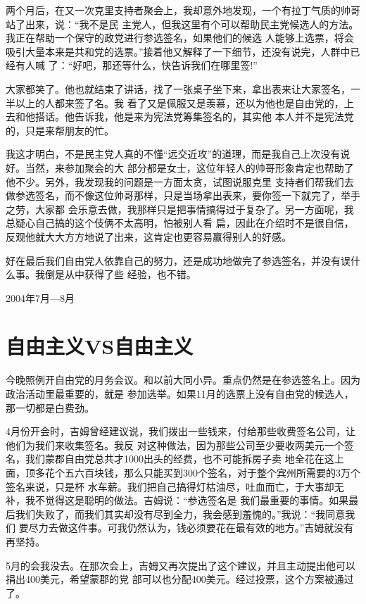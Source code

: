 ﻿\documentclass[11pt]{article}
\begin{document}
两个月后，在又一次克里支持者聚会上，我却意外地发现，一个有拉丁气质的帅哥站了出来，说：``我不是民
主党人，但我这里有个可以帮助民主党候选人的方法。我正在帮助一个保守的政党进行参选签名，如果他们的候选
人能够上选票，将会吸引大量本来是共和党的选票。''接着他又解释了一下细节，还没有说完，人群中已经有人喊
了：``好吧，那还等什么，快告诉我们在哪里签!''

大家都笑了。他也就结束了讲话，找了一张桌子坐下来，拿出表来让大家签名，一半以上的人都来签了名。我
看了又是佩服又是羡慕，还以为他也是自由党的，上去和他搭话。他告诉我，他是来为宪法党筹集签名的，其实他
本人并不是宪法党的，只是来帮朋友的忙。

我这才明白，不是民主党人真的不懂``远交近攻''的道理，而是我自己上次没有说好。当然，来参加聚会的大
部分都是女士，这位年轻人的帅哥形象肯定也帮助了他不少。另外，我发现我的问题是一方面太贪，试图说服克里
支持者们帮我们去做参选签名，而不像这位帅哥那样，只是当场拿出表来，要你签一下就完了，举手之劳，大家都
会乐意去做，我那样只是把事情搞得过于复杂了。另一方面呢，我总疑心自己搞的这个伎俩不太高明，怕被别人看
扁，因此在介绍时不是很自信，反观他就大大方方地说了出来，这肯定也更容易赢得别人的好感。

好在最后我们自由党人依靠自己的努力，还是成功地做完了参选签名，并没有误什么事。我倒是从中获得了些
经验，也不错。

2004年7月---8月

\section{自由主义VS自由主义}

今晚照例开自由党的月务会议。和以前大同小异。重点仍然是在参选签名上。因为政治活动里最重要的，就是
参加选举。如果11月的选票上没有自由党的候选人，那一切都是白费劲。

4月份开会时，吉姆曾经建议说，我们拨出一些钱来，付给那些收费签名公司，让他们为我们来收集签名。我反
对这种做法，因为那些公司至少要收两美元一个签名，我们蒙郡自由党总共才1000出头的经费，也不可能拆房子卖
地全花在这上面，顶多花个五六百块钱，那么只能买到300个签名，对于整个宾州所需要的3万个签名来说，只是杯
水车薪。我们把自己搞得灯枯油尽，吐血而亡，于大事却无补，我不觉得这是聪明的做法。吉姆说：``参选签名是
我们最重要的事情。如果最后我们失败了，而我们其实却没有尽到全力，我会感到羞愧的。''我说：``我同意我们
要尽力去做这件事。可我仍然认为，钱必须要花在最有效的地方。''吉姆就没有再坚持。

5月的会我没去。在那次会上，吉姆又再次提出了这个建议，并且主动提出他可以捐出400美元，希望蒙郡的党
部可以也分配400美元。经过投票，这个方案被通过了。
\end{document}
